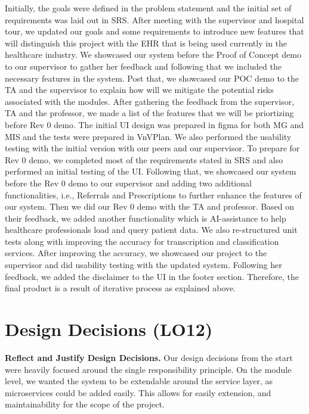 \documentclass{article}
\begin{document}
Initially, the goals were defined in the problem statement and the initial set of requirements was laid out in SRS. After meeting with the supervisor and hospital tour, we updated our goals and some requirements to introduce new features that will distinguish this project with the EHR that is being used currently in the healthcare industry. We showcased our system before the Proof of Concept demo to our supervisor to gather her feedback and following that we included the necessary features in the system. Post that, we showcased our POC demo to the TA and the supervisor to explain how will we mitigate the potential risks associated with the modules. After gathering the feedback from the supervisor, TA and the professor, we made a list of the features that we will be priortizing before Rev 0 demo. The initial UI design was prepared in figma for both MG and MIS and the tests were prepared in VnVPlan. We also performed the usability testing with the initial version with our peers and our supervisor. To prepare for Rev 0 demo, we completed most of the requirements stated in SRS and also performed an initial testing of the UI. Following that, we showcased our system before the Rev 0 demo to our supervisor and adding two additional functionalities, i.e., Referrals and Prescriptions to further enhance the features of our system. Then we did our Rev 0 demo with the TA and professor. Based on their feedback, we added another functionality which is AI-assistance to help healthcare professionals load and query patient data. We also re-structured unit tests along with improving the accuracy for transcription and classification services. After improving the accuracy, we showcased our project to the supervisor and did usability testing with the updated system. Following her feedback, we added the disclaimer to the UI in the footer section. Therefore, the final product is a result of iterative process as explained above.        

\section{Design Decisions (LO12)}


\textbf{Reflect and Justify Design Decisions.}
Our design decisions from the start were heavily focused around the single responsibility principle. On the module level, we wanted the system to be extendable around the service layer, as microservices could be added easily. This allows for easily extension, and maintainability for the scope of the project. 
\end{document}
